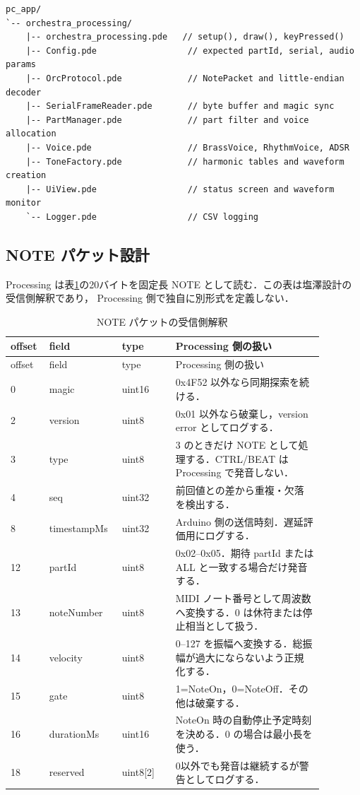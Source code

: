 \documentclass[lualatex,book,openany,paper=a4paper,jafontsize=11.5pt,jafontscale=1.05]{jlreq}
\begin{document}
\begin{lstlisting}[style=textdiagram, caption={Processing 実装予定ファイル構成}, label={lst:filetree}]
pc_app/
`-- orchestra_processing/
    |-- orchestra_processing.pde   // setup(), draw(), keyPressed()
    |-- Config.pde                  // expected partId, serial, audio params
    |-- OrcProtocol.pde             // NotePacket and little-endian decoder
    |-- SerialFrameReader.pde       // byte buffer and magic sync
    |-- PartManager.pde             // part filter and voice allocation
    |-- Voice.pde                   // BrassVoice, RhythmVoice, ADSR
    |-- ToneFactory.pde             // harmonic tables and waveform creation
    |-- UiView.pde                  // status screen and waveform monitor
    `-- Logger.pde                  // CSV logging
\end{lstlisting}

\subsection{NOTE パケット設計}
Processing は表\ref{tab:note}の20バイトを固定長 NOTE として読む．この表は塩澤設計の受信側解釈であり，
Processing 側で独自に別形式を定義しない．

\begin{longtable}{p{0.10\linewidth}p{0.18\linewidth}p{0.16\linewidth}p{0.44\linewidth}}
\caption{NOTE パケットの受信側解釈}\label{tab:note}\\
\hline
offset & field & type & Processing 側の扱い \\
\hline
\endfirsthead
\hline
offset & field & type & Processing 側の扱い \\
\hline
\endhead
0 & magic & uint16 & 0x4F52 以外なら同期探索を続ける． \\
\hline
2 & version & uint8 & 0x01 以外なら破棄し，version error としてログする． \\
\hline
3 & type & uint8 & 3 のときだけ NOTE として処理する．CTRL/BEAT は Processing で発音しない． \\
\hline
4 & seq & uint32 & 前回値との差から重複・欠落を検出する． \\
\hline
8 & timestampMs & uint32 & Arduino 側の送信時刻．遅延評価用にログする． \\
\hline
12 & partId & uint8 & 0x02--0x05．期待 partId または ALL と一致する場合だけ発音する． \\
\hline
13 & noteNumber & uint8 & MIDI ノート番号として周波数へ変換する．0 は休符または停止相当として扱う． \\
\hline
14 & velocity & uint8 & 0--127 を振幅へ変換する．総振幅が過大にならないよう正規化する． \\
\hline
15 & gate & uint8 & 1=NoteOn，0=NoteOff．その他は破棄する． \\
\hline
16 & durationMs & uint16 & NoteOn 時の自動停止予定時刻を決める．0 の場合は最小長を使う． \\
\hline
18 & reserved & uint8[2] & 0以外でも発音は継続するが警告としてログする． \\
\hline
\end{longtable}
\end{document}
